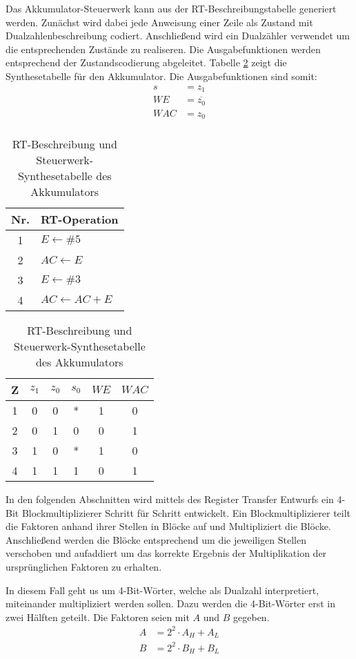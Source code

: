 Das Akkumulator-Steuerwerk kann aus der RT-Beschreibungstabelle generiert werden. Zunächst wird dabei jede Anweisung einer Zeile als Zustand mit Dualzahlenbeschreibung codiert. Anschließend wird ein Dualzähler verwendet um die entsprechenden Zustände zu realiseren. Die Ausgabefunktionen werden entsprechend der Zustandscodierung abgeleitet. Tabelle \ref{AkkuSteuerwerkSynthese} zeigt die Synthesetabelle für den Akkumulator. Die Ausgabefunktionen sind somit:
\begin{align*}
	s &= z_1 \\
	WE &= \overline{z_0} \\
	WAC &= z_0 \\
\end{align*}

\begin{table}[htp]
\centering
\begin{tabular}{cl}
Nr. & RT-Operation\\\hline
1 & $E \leftarrow \#5$\\
2 & $AC \leftarrow E$\\
3 & $E \leftarrow \#3$\\
4 & $AC \leftarrow AC + E$\\
\end{tabular}
\hspace{0.7cm}
\begin{tabular}{c|cc|ccc}
Z & $z_1$ & $z_0$ & $s_0$ & $WE$ & $WAC$ \\ \hline
1 & 0     & 0     & *     & 1      & 0       \\
2 & 0     & 1     & 0     & 0      & 1       \\
3 & 1     & 0     & *     & 1      & 0       \\
4 & 1     & 1     & 1     & 0      & 1       \\
\end{tabular}
\caption{RT-Beschreibung und Steuerwerk-Synthesetabelle des Akkumulators}
\label{AkkuSteuerwerkSynthese}
\end{table}

In den folgenden Abschnitten wird mittels des Register Transfer Entwurfs ein 4-Bit Blockmultiplizierer Schritt für Schritt entwickelt. Ein Blockmultiplizierer teilt die Faktoren anhand ihrer Stellen in Blöcke auf und Multipliziert die Blöcke. Anschließend werden die Blöcke entsprechend um die jeweiligen Stellen verschoben und aufaddiert um das korrekte Ergebnis der Multiplikation der ursprünglichen Faktoren zu erhalten.

In diesem Fall geht us um 4-Bit-Wörter, welche als Dualzahl interpretiert, miteinander multipliziert werden sollen. Dazu werden die 4-Bit-Wörter erst in zwei Hälften geteilt. Die Faktoren seien mit $A$ und $B$ gegeben.
\begin{align*}
	A &= 2^2 \cdot A_H + A_L \\
	B &= 2^2 \cdot B_H + B_L \\	
\end{align*}

